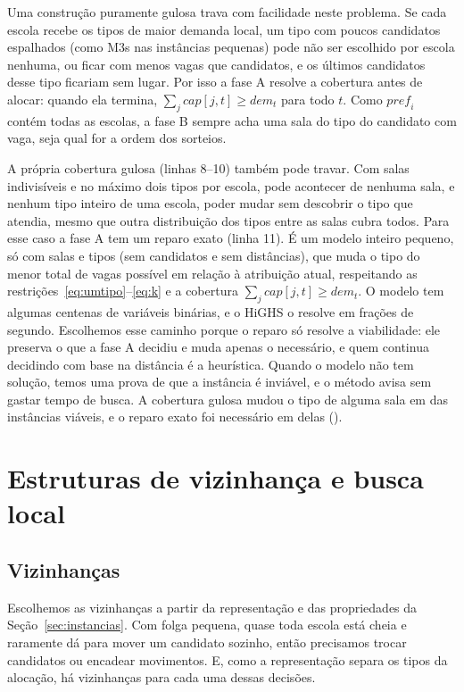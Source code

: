 \documentclass[12pt]{article}
\begin{document}
Uma construção puramente gulosa trava com facilidade neste problema. Se cada escola recebe os tipos
de maior demanda local, um tipo com poucos candidatos espalhados (como M3s nas instâncias pequenas)
pode não ser escolhido por escola nenhuma, ou ficar com menos vagas que candidatos, e os últimos
candidatos desse tipo ficariam sem lugar. Por isso a fase A resolve a cobertura antes de alocar:
quando ela termina, $\sum_j \mathit{cap}[j,t] \ge \mathit{dem}_t$ para todo $t$. Como
$\mathit{pref}_i$ contém todas as escolas, a fase B sempre acha uma sala do tipo do candidato com
vaga, seja qual for a ordem dos sorteios.

A própria cobertura gulosa (linhas 8--10) também pode travar. Com salas indivisíveis e no máximo
dois tipos por escola, pode acontecer de nenhuma sala, e nenhum tipo inteiro de uma escola, poder
mudar sem descobrir o tipo que atendia, mesmo que outra distribuição dos tipos entre as salas
cubra todos. Para esse caso a fase A tem um reparo exato (linha 11). É um modelo inteiro pequeno,
só com salas e tipos (sem candidatos e sem distâncias), que muda o tipo do menor total de vagas
possível em relação à atribuição atual, respeitando as restrições~\eqref{eq:umtipo}--\eqref{eq:k}
e a cobertura $\sum_j \mathit{cap}[j,t] \ge \mathit{dem}_t$. O modelo tem algumas centenas de
variáveis binárias, e o HiGHS \cite{huangfu2018} o resolve em frações de segundo. Escolhemos esse
caminho porque o reparo só resolve a viabilidade: ele preserva o que a fase A decidiu e muda apenas
o necessário, e quem continua decidindo com base na distância é a heurística. Quando o modelo não
tem solução, temos uma prova de que a instância é inviável, e o método avisa sem gastar tempo de
busca. A cobertura gulosa mudou o tipo de alguma sala em \coberturaInst{} das \nInst{} instâncias
viáveis, e o reparo exato foi necessário em \reparoInst{} delas (\reparoIds).

\section{Estruturas de vizinhança e busca local}\label{sec:busca}

\subsection{Vizinhanças}

Escolhemos as vizinhanças a partir da representação e das propriedades da
Seção~\ref{sec:instancias}. Com folga pequena, quase toda escola está cheia e raramente dá para
mover um candidato sozinho, então precisamos trocar candidatos ou encadear movimentos. E, como a
representação separa os tipos da alocação, há vizinhanças para cada uma dessas decisões.
\end{document}
